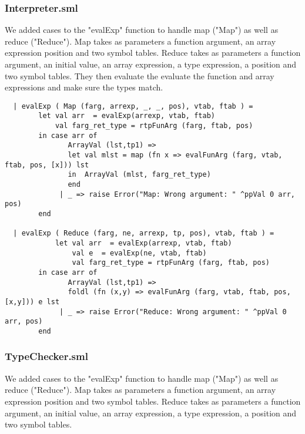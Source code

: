 \documentclass[12pt]{article}
\begin{document}
\subsubsection{Interpreter.sml}
We added cases to the "evalExp" function to handle map ("Map") as well as reduce ("Reduce"). Map takes as parameters a function argument, an array expression position and two symbol tables. Reduce takes as parameters a function argument, an initial value, an array expression, a type expression, a position and two symbol tables. They then evaluate the evaluate the function and array expressions and make sure the types match.
\begin{verbatim}
  | evalExp ( Map (farg, arrexp, _, _, pos), vtab, ftab ) =
        let val arr  = evalExp(arrexp, vtab, ftab)
            val farg_ret_type = rtpFunArg (farg, ftab, pos)
        in case arr of
               ArrayVal (lst,tp1) =>
               let val mlst = map (fn x => evalFunArg (farg, vtab, ftab, pos, [x])) lst
               in  ArrayVal (mlst, farg_ret_type)
               end
             | _ => raise Error("Map: Wrong argument: " ^ppVal 0 arr, pos)
        end

  | evalExp ( Reduce (farg, ne, arrexp, tp, pos), vtab, ftab ) =
            let val arr  = evalExp(arrexp, vtab, ftab)
                val e  = evalExp(ne, vtab, ftab)
                val farg_ret_type = rtpFunArg (farg, ftab, pos)
        in case arr of
               ArrayVal (lst,tp1) =>
               foldl (fn (x,y) => evalFunArg (farg, vtab, ftab, pos, [x,y])) e lst
             | _ => raise Error("Reduce: Wrong argument: " ^ppVal 0 arr, pos)
        end
\end{verbatim}
\subsubsection{TypeChecker.sml}
We added cases to the "evalExp" function to handle map ("Map") as well as reduce ("Reduce"). Map takes as parameters a function argument, an array expression position and two symbol tables. Reduce takes as parameters a function argument, an initial value, an array expression, a type expression, a position and two symbol tables.\\
\end{document}
